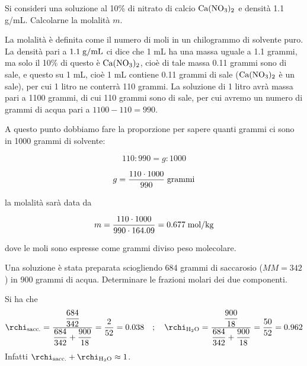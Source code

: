 \begin{esercizio}[$\bigstar$]
    Si consideri una soluzione al 10\% di nitrato di calcio $\rm Ca(NO_3)_2$ e densità 1.1 g/mL. Calcolarne la molalità $m$.
\end{esercizio}
\begin{soluzione}
    La molalità è definita come il numero di moli in un chilogrammo di solvente puro. La densità pari a $1.1 \; \rm g/mL$ ci dice che 1 mL ha una massa uguale a 1.1 grammi, ma solo il 10\% di questo è $\rm Ca(NO_3)_2$, cioè di tale massa 0.11 grammi sono di sale, e questo su 1 mL, cioè 1 mL contiene 0.11 grammi di sale ($\rm Ca(NO_3)_2$ è un sale), per cui 1 litro ne conterrà 110 grammi. La soluzione di 1 litro avrà massa pari a 1100 grammi, di cui 110 grammi sono di sale, per cui avremo un numero di grammi di acqua pari a $1100-110=990$.

A questo punto dobbiamo fare la proporzione per sapere quanti grammi ci sono in 1000 grammi di solvente:

$$110:990=g:1000$$

$$g=\frac{110 \cdot 1000}{990} \; \rm grammi$$

la molalità sarà data da

$$m=\frac{110 \cdot 1000}{990 \cdot 164.09}=0.677 \; \rm mol/kg$$

dove le moli sono espresse come grammi diviso peso molecolare.
\end{soluzione}

\newpage

\begin{esercizio}[$\bigstar$]
    Una soluzione è stata preparata sciogliendo 684 grammi di saccarosio ($MM=342$) in 900 grammi di acqua. Determinare le frazioni molari dei due componenti.
\end{esercizio}
\begin{soluzione}
    Si ha che
    \begin{equation*}
        \rchi_{\rm sacc.}
        =\frac{\displaystyle \frac{684}{342}}{\displaystyle \frac{684}{342} + \frac{900}{18}}
        =\frac{2}{52}=0.038
        \quad;\quad
        \rchi_{\rm H_2O}
        =\frac{\displaystyle \frac{900}{18}}{\displaystyle \frac{684}{342} + \frac{900}{18}}
        =\frac{50}{52}
        =0.962
    \end{equation*}
    Infatti $\rchi_{\rm sacc.} + \rchi_{\rm H_2O}\approx 1$.
\end{soluzione}

\newpage


